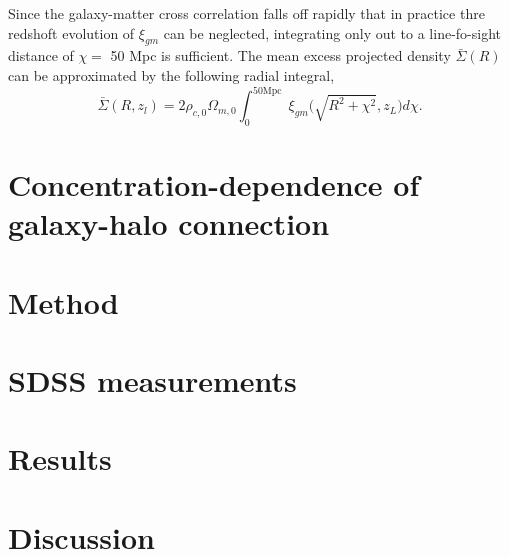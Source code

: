 \documentclass[12pt, preprint]{aastex}
\newcommand{\beq}{\begin{equation}}
\newcommand{\eeq}{\end{equation}}
\begin{document}
Since the galaxy-matter cross correlation falls off rapidly that in practice thre redshoft evolution of $\xi_{gm}$ 
can be neglected, integrating only out to a line-fo-sight distance of $\chi=$ 50 Mpc is sufficient. 
The mean excess projected density $\bar{\Sigma}(R)$ can be approximated by the following radial integral,
\beq
\bar{\Sigma}(R , z_{l}) = 2 \rho_{c,0}\Omega_{m,0}\int_{0}^{\mathrm{50Mpc}} \; \xi_{gm}\Big(\sqrt{R^{2}+\chi^{2}},z_{L} \Big)d\chi.
\eeq

\section{Concentration-dependence of galaxy-halo connection}

\section{Method}

\section{SDSS measurements}

\section{Results}

\section{Discussion}


\begin{thebibliography}{70}


\end{thebibliography}
\end{document}
